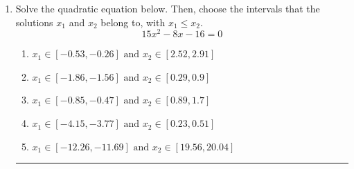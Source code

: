 \documentclass[14pt]{extbook}
\newcommand{\litem}[1]{\item#1\hspace*{-1cm}\rule{\textwidth}{0.4pt}}
\begin{document}
\begin{enumerate}
{\begin{enumerate}[label=\Alph*.]
\end{enumerate} }
\litem{
Solve the quadratic equation below. Then, choose the intervals that the solutions $x_1$ and $x_2$ belong to, with $x_1 \leq x_2$.\[ 15x^{2} -8 x -16 = 0 \]\begin{enumerate}[label=\Alph*.]
\item \( x_1 \in [-0.53, -0.26] \text{ and } x_2 \in [2.52, 2.91] \)
\item \( x_1 \in [-1.86, -1.56] \text{ and } x_2 \in [0.29, 0.9] \)
\item \( x_1 \in [-0.85, -0.47] \text{ and } x_2 \in [0.89, 1.7] \)
\item \( x_1 \in [-4.15, -3.77] \text{ and } x_2 \in [0.23, 0.51] \)
\item \( x_1 \in [-12.26, -11.69] \text{ and } x_2 \in [19.56, 20.04] \)

\end{enumerate} }
\end{enumerate}
\end{document}
